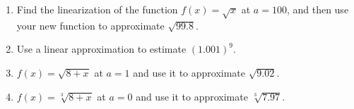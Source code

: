 \begin{enumerate}
\item Find the linearization of the function $f(x) = \sqrt{x}$ at $a = 100$, and then use your new function to approximate
$\sqrt{99.8}$.


\item Use a linear approximation to estimate $(1.001)^9$. 


\item $f(x)=\sqrt{8+x}$ at $a=1$ and use it to approximate $\sqrt{9.02}$.

\item $f(x)=\sqrt[3]{8+x}$ at $a=0$ and use it to approximate $\sqrt[3] {7.97}$.


\end{enumerate}
